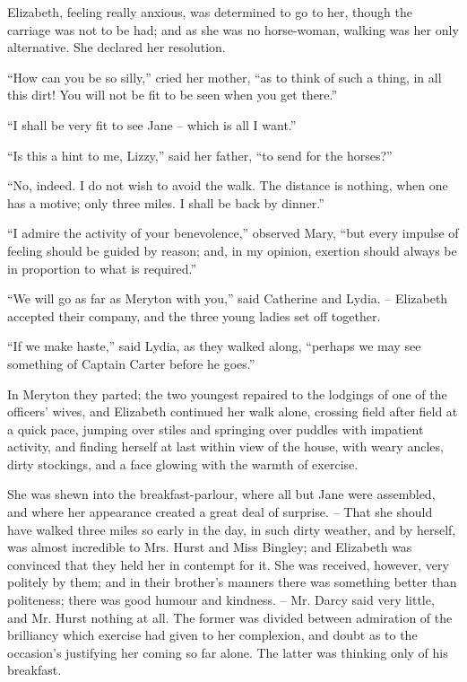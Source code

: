 Elizabeth, feeling really anxious, was determined to go
to her, though the carriage was not to be had; and as
she was no horse-woman, walking was her only alternative.
She declared her resolution.

“How can you be so silly,” cried her mother, “as to
think of such a thing, in all this dirt! You will not be
fit to be seen when you get there.”

“I shall be very fit to see Jane -- which is all I want.”

“Is this a hint to me, Lizzy,” said her father, “to send
for the horses?”

“No, indeed. I do not wish to avoid the walk. The
distance is nothing, when one has a motive; only three
miles. I shall be back by dinner.”

“I admire the activity of your benevolence,” observed
Mary, “but every impulse of feeling should be guided by
reason; and, in my opinion, exertion should always be
in proportion to what is required.”

“We will go as far as Meryton with you,” said Catherine
and Lydia. -- Elizabeth accepted their company, and the
three young ladies set off together.

“If we make haste,” said Lydia, as they walked along,
“perhaps we may see something of Captain Carter before
he goes.”

In Meryton they parted; the two youngest repaired
to the lodgings of one of the officers’ wives, and Elizabeth
continued her walk alone, crossing field after field at a
quick pace, jumping over stiles and springing over puddles
with impatient activity, and finding herself at last within
view of the house, with weary ancles, dirty stockings, and
a face glowing with the warmth of exercise.

She was shewn into the breakfast-parlour, where all
but Jane were assembled, and where her appearance
created a great deal of surprise. -- That she should have
walked three miles so early in the day, in such dirty
weather, and by herself, was almost incredible to Mrs.
Hurst and Miss Bingley; and Elizabeth was convinced
that they held her in contempt for it. She was received,
however, very politely by them; and in their brother’s
manners there was something better than politeness;
there was good humour and kindness. -- Mr. Darcy said
very little, and Mr. Hurst nothing at all. The former
was divided between admiration of the brilliancy which
exercise had given to her complexion, and doubt as to
the occasion’s justifying her coming so far alone. The
latter was thinking only of his breakfast.

